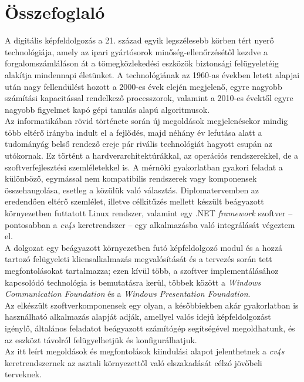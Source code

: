 \chapter*{Összefoglaló}

A digitális képfeldolgozás a 21. század egyik legszélesebb körben tért nyerő technológiája, amely az ipari gyártósorok minőség-ellenőrzésétől kezdve a forgalomszámláláson át a tömegközlekedési eszközök biztonsági felügyeletéig alakítja mindennapi életünket. A technológiának az 1960-as években letett alapjai után nagy fellendülést hozott a 2000-es évek elején megjelenő, egyre nagyobb számítási kapacitással rendelkező processzorok, valamint a 2010-es évektől egyre nagyobb figyelmet kapó gépi tanulás alapú algoritmusok.\\
Az informatikában rövid története során új megoldások megjelenésekor mindig több eltérő irányba indult el a fejlődés, majd néhány év lefutása alatt a tudományág belső rendező ereje pár rivális technológiát hagyott csupán az utókornak. Ez történt a hardverarchitektúrákkal, az operációs rendszerekkel, de a szoftverfejlesztési szemléletekkel is. A mérnöki gyakorlatban gyakori feladat a különböző, egymással nem kompatibilis rendszerek vagy komponensek összehangolása, esetleg a közülük való választás. Diplomatervemben az eredendően eltérő szemlélet, illetve célkitűzés mellett készült beágyazott környezetben futtatott Linux rendszer, valamint egy .NET \emph{framework} szoftver -- pontosabban a \emph{cv4s} keretrendszer -- egy alkalmazásba való integrálását végeztem el.\\
A dolgozat egy beágyazott környezetben futó képfeldolgozó modul és a hozzá tartozó felügyeleti kliensalkalmazás megvalósítását és a tervezés során tett megfontolásokat tartalmazza; ezen kívül több, a szoftver implementálásához kapcsolódó technológia is bemutatásra kerül, többek között a \emph{Windows Communication Foundation} és a \emph{Windows Presentation Foundation}.\\
Az elkészült szoftverkomponensek egy olyan, a későbbiekben akár gyakorlatban is használható alkalmazás alapját adják, amellyel valós idejű képfeldolgozást igénylő, általános feladatot beágyazott számítógép segítségével megoldhatunk, és az eszközt távolról felügyelhetjük és konfigurálhatjuk.\\
Az itt leírt megoldások és megfontolások kiindulási alapot jelenthetnek a \emph{cv4s} keretrendszernek az asztali környezettől való elszakadását célzó jövőbeli terveknek.
